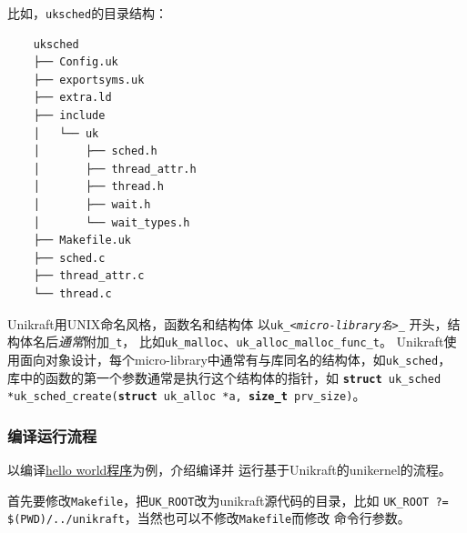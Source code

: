 \documentclass{../runikraft-report}
\begin{document}
比如，\texttt{uksched}的目录结构：
{\linespread{1}
\begin{verbatim}
    uksched
    ├── Config.uk
    ├── exportsyms.uk
    ├── extra.ld
    ├── include
    │   └── uk
    │       ├── sched.h
    │       ├── thread_attr.h
    │       ├── thread.h
    │       ├── wait.h
    │       └── wait_types.h
    ├── Makefile.uk
    ├── sched.c
    ├── thread_attr.c
    └── thread.c
\end{verbatim}}

Unikraft用UNIX命名风格，函数名和结构体
以\texttt{uk\_\hspace{0cm}\textit{<micro-library\hspace{0cm}名\hspace{0cm}>}\hspace{0cm}\_}
开头，结构体名后\textit{通常}附加\texttt{\_t}，
比如\texttt{uk\_malloc}、\texttt{uk\_alloc\_malloc\_func\_t}。
Unikraft使用面向对象设计，每个micro-library中通常有与库同名的结构体，如\texttt{uk\_sched}，
库中的函数的第一个参数通常是执行这个结构体的指针，如
\texttt{\textbf{struct} uk\_sched *uk\_sched\_create(\textbf{struct} uk\_alloc *a, \textbf{size\_t} prv\_size)}。

\subsubsection{编译运行流程}
以编译\href{https://github.com/unikraft/app-helloworld}{hello world程序}为例，介绍编译并
运行基于Unikraft的unikernel的流程。

首先要修改\texttt{Makefile}，把\texttt{UK\_ROOT}改为unikraft源代码的目录，比如
\texttt{UK\_ROOT ?= \linebreak\$(PWD)/../unikraft}，当然也可以不修改\texttt{Makefile}而修改
命令行参数。
\end{document}
